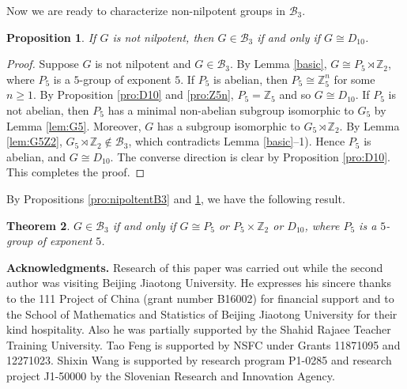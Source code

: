 \documentclass[12pt,a4paper]{article}
\newtheorem{thm}{Theorem}[section]
\newtheorem{pro}[thm]{Proposition}
\def \geq {\geqslant}
\begin{document}
	 Now we are ready to characterize non-nilpotent groups in $\mathcal{B}_3$.
	\begin{pro}\label{pro:not nilpotent}
		If $G$ is not nilpotent, then $G\in \mathcal{B}_3$ if and only if $G\cong D_{10}$.
	\end{pro}
	\begin{proof}
		Suppose $G$ is not nilpotent and $G\in \mathcal{B}_3$.
		By Lemma \ref{basic}, $G\cong P_5\rtimes \mathbb{Z}_2$, where $P_5$ is a $5$-group of exponent $5$.
		If $P_5$ is abelian, then $P_5\cong \mathbb{Z}_5^n$ for some $n\geq 1$.
		By Proposition \ref{pro:D10} and \ref{pro:Z5n}, $P_5=\mathbb{Z}_5$ and so $G\cong D_{10}$.
		If $P_5$ is not abelian, then $P_5$ has a minimal non-abelian subgroup isomorphic to $G_5$ by Lemma \ref{lem:G5}.
		Moreover, $G$ has a subgroup isomorphic to $G_5\rtimes \mathbb{Z}_2$.
		By Lemma \ref{lem:G5Z2}, $G_5\rtimes \mathbb{Z}_2\notin \mathcal{B}_3$, which contradicts Lemma \ref{basic}--1).
		Hence $P_5$ is abelian, and $G\cong D_{10}$. The converse direction is clear by Proposition \ref{pro:D10}. This completes the proof.
	\end{proof}
	
	By Propositions \ref{pro:nipoltentB3} and \ref{pro:not nilpotent}, we have the following result.
	\begin{thm}\label{thm:B3}
		$G\in \mathcal{B}_3$ if and only if $G\cong P_5$ or $P_5\times \mathbb{Z}_2$ or $D_{10}$, where $P_5$ is a $5$-group of exponent $5$.
	\end{thm}
	
	\textbf{Acknowledgments.}
	Research of this paper was carried out while the second author was visiting Beijing Jiaotong University. He expresses his sincere thanks to the 111 Project of China (grant number B16002) for financial support and to the School of Mathematics and Statistics of Beijing Jiaotong University for their kind hospitality. Also he was partially supported by the Shahid Rajaee Teacher Training University. Tao Feng is supported by NSFC under Grants 11871095 and 12271023. Shixin Wang is supported by research program P1-0285 and research project J1-50000 by the Slovenian Research and Innovation Agency.
	
	
	
	
	
\end{document}
